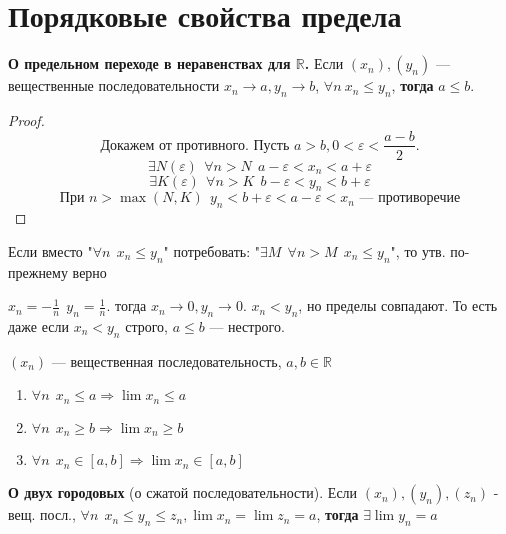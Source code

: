 \section*{Порядковые свойства предела}

\begin{theorem}
\textbf{О предельном переходе в неравенствах для $\mathbb{R}$.} Если $(x_n),(y_n)$ ---
вещественные последовательности $x_n\to a, y_n\to b$, $\forall n \ x_n\leq y_n$, \textbf{тогда} $a\leq b$.
\end{theorem}

\begin{proof}
$$\text{Докажем от противного. Пусть } a>b, 0<\varepsilon <\frac{a-b}{2}.$$
$$\exists N(\varepsilon) \ \ \forall n>N \ \ a-\varepsilon<x_n<a+\varepsilon$$
$$\exists K(\varepsilon) \ \ \forall n>K \ \ b-\varepsilon<y_n<b+\varepsilon $$
$$\text{При } n>\max(N,K) \ \ y_n < b + \varepsilon < a-\varepsilon <x_n \text{ --- противоречие}$$
\end{proof}

\begin{remark}
Если вместо "$\forall n \ \ x_n\leq y_n$" потребовать: "$\exists M \ \ \forall n>M \ \ x_n\leq y_n$", то утв. по-прежнему верно
\end{remark}

\begin{remark}
$x_n=-\frac{1}{n} \ \ y_n=\frac{1}{n}$. тогда $x_n\to 0, y_n\to 0$. $x_n<y_n$, но пределы совпадают. То есть даже если $x_n<y_n$ строго, $a\leq b$ --- нестрого.
\end{remark}

\begin{consequence}
$(x_n)$ --- вещественная последовательность, $a,b\in\mathbb{R}$
\begin{enumerate}
\item $\forall n \ \ x_n\leq a \Rightarrow \lim x_n\leq a$
\item $\forall n \ \ x_n\geq b \Rightarrow \lim x_n\geq b$
\item $\forall n \ \ x_n\in [a,b] \Rightarrow \lim x_n\in [a,b]$
\end{enumerate}
\end{consequence}

\begin{theorem}
\textbf{О двух городовых} (о сжатой последовательности). Если $(x_n),(y_n),(z_n)$ - вещ. посл., $\forall n \ \ x_n\leq y_n\leq z_n, \lim x_n=\lim z_n =a$, \textbf{тогда} $\exists \lim y_n=a$
\end{theorem}

